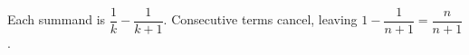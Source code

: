 Each summand is $\dfrac{1}{k}-\dfrac{1}{k+1}$. Consecutive terms cancel, leaving $1-\dfrac{1}{n+1}=\boxed{\dfrac{n}{n+1}}$.
